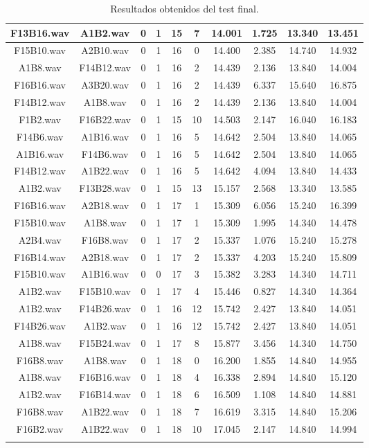 \documentclass[11pt,a4paper]{book}
\begin{document}
\begin{longtable}[c]{|c|c|c|c|c|c|c|c|c|c|}
F13B16.wav&A1B2.wav&0&1&15&7&14.001&1.725&13.340&13.451\\ \hline
F15B10.wav&A2B10.wav&0&1&16&0&14.400&2.385&14.740&14.932\\ \hline
A1B8.wav&F14B12.wav&0&1&16&2&14.439&2.136&13.840&14.004\\ \hline
F16B16.wav&A3B20.wav&0&1&16&2&14.439&6.337&15.640&16.875\\ \hline
F14B12.wav&A1B8.wav&0&1&16&2&14.439&2.136&13.840&14.004\\ \hline
F1B2.wav&F16B22.wav&0&1&15&10&14.503&2.147&16.040&16.183\\ \hline
F14B6.wav&A1B16.wav&0&1&16&5&14.642&2.504&13.840&14.065\\ \hline
A1B16.wav&F14B6.wav&0&1&16&5&14.642&2.504&13.840&14.065\\ \hline
F14B12.wav&A1B22.wav&0&1&16&5&14.642&4.094&13.840&14.433\\ \hline
A1B2.wav&F13B28.wav&0&1&15&13&15.157&2.568&13.340&13.585\\ \hline
F16B16.wav&A2B18.wav&0&1&17&1&15.309&6.056&15.240&16.399\\ \hline
F15B10.wav&A1B8.wav&0&1&17&1&15.309&1.995&14.340&14.478\\ \hline
A2B4.wav&F16B8.wav&0&1&17&2&15.337&1.076&15.240&15.278\\ \hline
F16B14.wav&A2B18.wav&0&1&17&2&15.337&4.203&15.240&15.809\\ \hline
F15B10.wav&A1B16.wav&0&0&17&3&15.382&3.283&14.340&14.711\\ \hline
A1B2.wav&F15B10.wav&0&1&17&4&15.446&0.827&14.340&14.364\\ \hline
A1B2.wav&F14B26.wav&0&1&16&12&15.742&2.427&13.840&14.051\\ \hline
F14B26.wav&A1B2.wav&0&1&16&12&15.742&2.427&13.840&14.051\\ \hline
A1B8.wav&F15B24.wav&0&1&17&8&15.877&3.456&14.340&14.750\\ \hline
F16B8.wav&A1B8.wav&0&1&18&0&16.200&1.855&14.840&14.955\\ \hline
A1B8.wav&F16B16.wav&0&1&18&4&16.338&2.894&14.840&15.120\\ \hline
A1B2.wav&F16B14.wav&0&1&18&6&16.509&1.108&14.840&14.881\\ \hline
F16B8.wav&A1B22.wav&0&1&18&7&16.619&3.315&14.840&15.206\\ \hline
F16B2.wav&A1B22.wav&0&1&18&10&17.045&2.147&14.840&14.994\\ \hline
\caption{Resultados obtenidos del test final.}
\end{longtable}
\end{document}
